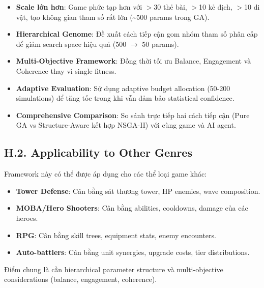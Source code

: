 \begin{itemize}
    \item \textbf{Scale lớn hơn}: Game phức tạp hơn với $>$30 thẻ bài, $>$10 kẻ địch, $>$10 di vật, tạo không gian tham số rất lớn (\textasciitilde 500 params trong GA).
    \item \textbf{Hierarchical Genome}: Đề xuất cách tiếp cận gom nhóm tham số phân cấp để giảm search space hiệu quả (500 $\rightarrow$ 50 params).
    \item \textbf{Multi-Objective Framework}: Đồng thời tối ưu Balance, Engagement và Coherence thay vì single fitness.
    \item \textbf{Adaptive Evaluation}: Sử dụng adaptive budget allocation (50-200 simulations) để tăng tốc trong khi vẫn đảm bảo statistical confidence.
    \item \textbf{Comprehensive Comparison}: So sánh trực tiếp hai cách tiếp cận (Pure GA vs Structure-Aware kết hợp NSGA-II) với cùng game và AI agent.
\end{itemize}

\subsection*{H.2. Applicability to Other Genres}

Framework này có thể được áp dụng cho các thể loại game khác:

\begin{itemize}
    \item \textbf{Tower Defense}: Cân bằng sát thương tower, HP enemies, wave composition.
    \item \textbf{MOBA/Hero Shooters}: Cân bằng abilities, cooldowns, damage của các heroes.
    \item \textbf{RPG}: Cân bằng skill trees, equipment stats, enemy encounters.
    \item \textbf{Auto-battlers}: Cân bằng unit synergies, upgrade costs, tier distributions.
\end{itemize}

Điểm chung là cần hierarchical parameter structure và multi-objective considerations (balance, engagement, coherence).

